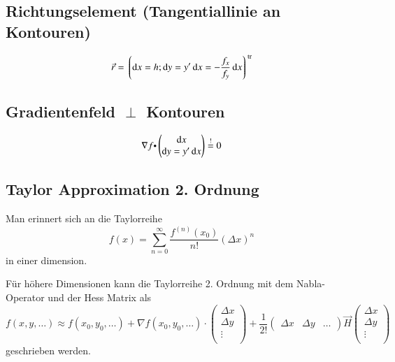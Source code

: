\subsection{Richtungselement (Tangentiallinie an Kontouren)}
\[
    \vec{r} = \left\lgroup\mathop{} \! \mathrm{d} x = h; \mathop{} \! \mathrm{d} y = y'\mathop{} \! \mathrm{d} x = -\frac{f_{x}}{f_{y}}\mathop{} \! \mathrm{d} x\right\rgroup^{\operatorname{tr}}
\]


\subsection{Gradientenfeld \texorpdfstring{$\perp$}{\_|\_} Kontouren}
\[
    \nabla f \tikznode{scprd}{\dotp} \begin{pmatrix}
        \diff x\\
        \diff y = y'\diff x
    \end{pmatrix} \overset{!}{=} 0
\]


\subsection{Taylor Approximation 2. Ordnung}
Man erinnert sich an die Taylorreihe
\[
    f(x) = \sum_{n=0}^{\infty}\frac{f^{(n)}(x_0)}{n!}(\Delta x)^n
\]
in einer dimension. 

Für höhere Dimensionen kann die Taylorreihe 2. Ordnung mit dem Nabla-Operator und der Hess Matrix als
\[
    f(x, y, \dots) \approx f(x_0, y_0, \dots) + \nabla f(x_0, y_0, \dots) \cdot \begin{pmatrix} \Delta x \\ \Delta y \\ \vdots \\ \end{pmatrix} + \frac{1}{2!} \begin{pmatrix} \Delta x & \Delta y & \dots \end{pmatrix} \vec{H} \begin{pmatrix} \Delta x \\ \Delta y \\ \vdots \\ \end{pmatrix}
\]
geschrieben werden.

